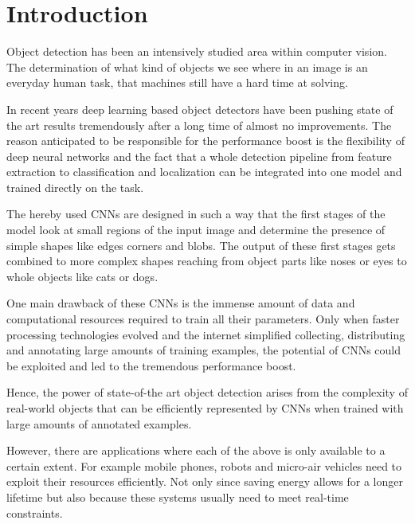 \chapter{Introduction}
\label{sec:intro}

Object detection has been an intensively studied area within computer vision. The determination of what kind of objects we see where in an image is an everyday human task, that machines still have a hard time at solving.


In recent years deep learning based object detectors have been pushing state of the art results tremendously after a long time of almost no improvements. The reason anticipated to be responsible for the performance boost is the flexibility of deep neural networks and the fact that a whole detection pipeline from feature extraction to classification and localization can be integrated into one model and trained directly on the task.

The hereby used \acp{CNN} are designed in such a way that the first stages of the model look at small regions of the input image and determine the presence of simple shapes like edges corners and blobs. The output of these first stages gets combined to more complex shapes reaching from object parts like noses or eyes to whole objects like cats or dogs.

One main drawback of these \acp{CNN} is the immense amount of data and computational resources required to train all their parameters. Only when faster processing technologies evolved and the internet simplified collecting, distributing and annotating large amounts of training examples, the potential of \acp{CNN} could be exploited  and led to the tremendous performance boost. 

Hence, the power of state-of-the art object detection arises from the complexity of real-world objects that can be efficiently represented by \acp{CNN} when trained with large amounts of annotated examples.

However, there are applications where each of the above is only available to a certain extent. For example mobile phones, robots and micro-air vehicles need to exploit their resources efficiently. Not only since saving energy allows for a longer lifetime but also because these systems usually need to meet real-time constraints.

